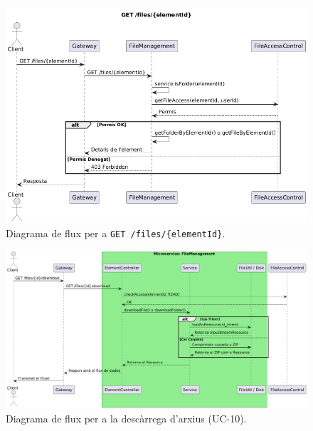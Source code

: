 \begin{figure}[H]
    \centering
    \includegraphics[width=1\textwidth]{Figures/flux/get_files.png}
    \caption{Diagrama de flux per a \texttt{GET /files/\{elementId\}}. }
    \label{fig:flow_get_files}
\end{figure}

\begin{figure}[H]
    \centering
    \includegraphics[width=1\textwidth]{Figures/flux/download_files.png}
    \caption{Diagrama de flux per a la descàrrega d'arxius (UC-10).}
    \label{fig:flow_download_files}
\end{figure}

